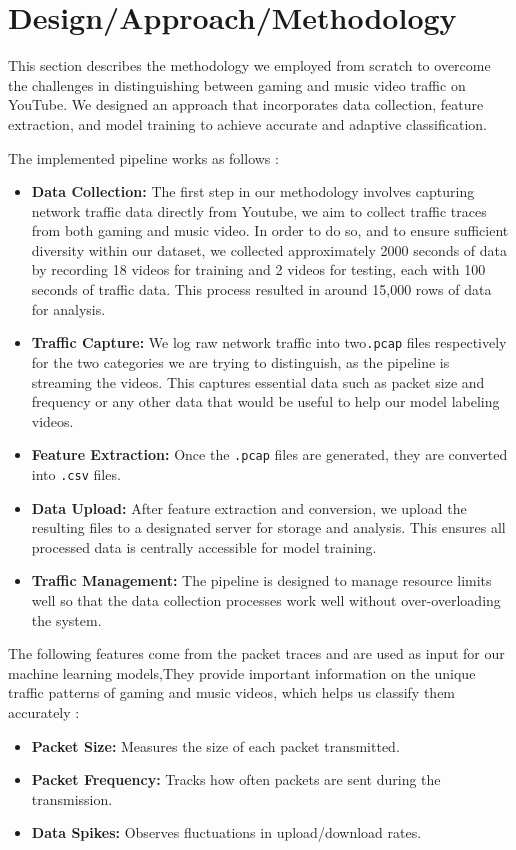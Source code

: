 \section{Design/Approach/Methodology} 



\label{sec:design}

This section describes the methodology we employed from scratch to overcome the challenges in distinguishing between gaming and music video traffic on YouTube. We designed an approach that incorporates data collection, feature extraction, and model training to achieve accurate and adaptive classification.

\vspace{2mm}


The implemented pipeline works as follows :
\begin{itemize}
    \item \textbf{Data Collection:} The first step in our methodology involves capturing network traffic data directly from Youtube, we aim to collect traffic traces from both gaming and music video. In order to do so, and to ensure sufficient diversity within our dataset, we collected approximately 2000 seconds of data by recording 18 videos for training and 2 videos for testing, each with 100 seconds of traffic data. This process resulted in around 15,000 rows of data for analysis.
    \item \textbf{Traffic Capture:} We log raw network traffic into two\texttt{.pcap} files respectively for the two categories we are trying to distinguish, as the pipeline is streaming the videos. This captures essential data such as packet size and frequency or any other data that would be useful to help our model labeling videos.
    \item \textbf{Feature Extraction:} Once the \texttt{.pcap} files are generated, they are converted into \texttt{.csv} files.
    \item \textbf{Data Upload:} After feature extraction and conversion, we upload the resulting files to a designated server for storage and analysis. This ensures all processed data is centrally accessible for model training.
    \item \textbf{Traffic Management:} The pipeline is designed to manage resource limits well so that the data collection processes work well without over-overloading the system.
\end{itemize}


The following features come from the packet traces and are used as input for our machine learning models,They provide important information on the unique traffic patterns of gaming and music videos, which helps us classify them accurately :
\begin{itemize}
    \item \textbf{Packet Size:} Measures the size of each packet transmitted.
    \item \textbf{Packet Frequency:} Tracks how often packets are sent during the transmission.
    \item \textbf{Data Spikes:} Observes fluctuations in upload/download rates.
\end{itemize}

